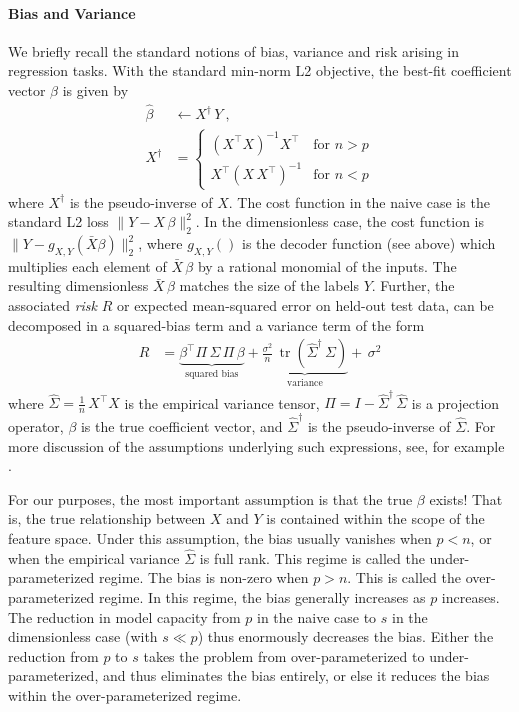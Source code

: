 \documentclass[twoside,11pt]{article}
\DeclareMathOperator{\tr}{tr}
\begin{document}
\paragraph{Bias and Variance}
We briefly recall the standard notions of bias, variance and risk arising in regression tasks. With the standard min-norm L2 objective, the best-fit coefficient vector $\hat\beta$ is given by
\begin{align}
    \hat\beta &\leftarrow X^\dagger\, Y~,\\
    X^\dagger &= \left\{\begin{array}{cr}
    (X^\top X)^{-1} X^\top & \mbox{for $n>p$} \\
    X^\top (X\,X^\top)^{-1} & \mbox{for $n<p$}
    \end{array}\right.
\end{align}
where $X^\dagger$ is the pseudo-inverse of $X$.
The cost function in the naive case is the standard L2 loss $\|Y-X\,\beta\|_2^2$.
In the dimensionless case, the cost function is $\|Y-g_{X,Y}(\bar{X}\beta)\|_2^2$, where $g_{X,Y}()$ is the decoder function (see above) which multiplies each element of $\bar{X}\,\beta$ by a rational monomial of the inputs. The resulting dimensionless $\bar{X}\,\beta$ matches the size of the labels $Y$. Further, the associated \emph{risk} $R$ or expected mean-squared error on held-out test data, can be decomposed in a squared-bias term and a variance term of the form
\begin{align}
    R &= \underbrace{\beta^\top \Pi\,\Sigma\,\Pi\,\beta}_{\mbox{squared bias}} + \underbrace{\frac{\sigma^2}{n}\,\tr(\hat\Sigma^\dagger\,\Sigma)}_{\mbox{variance}}
    +\,\sigma^2
\end{align}
where $\hat\Sigma = \frac{1}{n}\,X^\top X$ is the empirical variance tensor, 
$\Pi = I - \hat\Sigma^\dagger\,\hat\Sigma$ is a projection operator,  $\beta$ is the true coefficient vector,
and $\hat\Sigma^\dagger$ is the pseudo-inverse of $\hat\Sigma$.
For more discussion of the assumptions underlying such expressions, see, for example \cite{hastie}.

For our purposes, the most important assumption is that the true $\beta$ exists!
That is, the true relationship between $X$ and $Y$ is contained within the scope of the feature space.
Under this assumption, the bias usually vanishes when $p<n$, or when the empirical variance $\hat\Sigma$ is full rank.
This regime is called the under-parameterized regime.
The bias is non-zero when $p>n$.
This is called the over-parameterized regime.
In this regime, the bias generally increases as $p$ increases. The reduction in model capacity from $p$ in the naive case to $s$ in the dimensionless case (with $s\ll p$) thus enormously decreases the bias.
Either the reduction from $p$ to $s$ takes the problem from over-parameterized to under-parameterized, and thus eliminates the bias entirely, or else it reduces the bias within the over-parameterized regime. 
\end{document}
